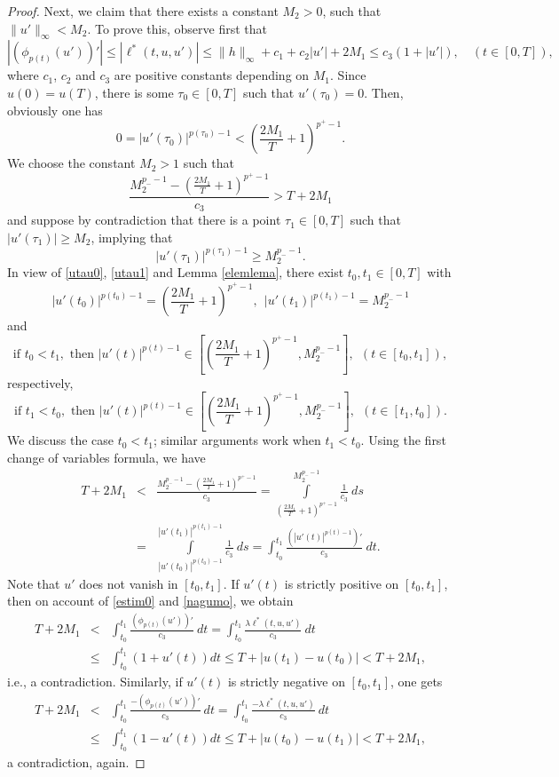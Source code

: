 \documentclass[11pt]{amsart}
\numberwithin{equation}{section} \textwidth=15.5cm
\begin{document}
\begin{proof}
Next, we claim that there exists a constant $M_2>0$, such that $\|u'\|_\infty<M_2$. To prove this, observe first that
\begin{equation}\label{nagumo}
    |(\phi_{p(t)}(u'))'|\leq|\ell^*(t,u,u')|\leq\|h\|_{\infty}+c_1+c_2|u'|+2M_1\leq c_3(1+|u'|),\quad (t\in[0,T]),
\end{equation}
where $c_1$, $c_2$ and $c_3$ are positive constants depending on $M_1$. Since $u(0)=u(T)$, there is some $\tau_0\in[0,T]$ such that $u'(\tau_0)=0$. Then, obviously one has
\begin{equation}\label{utau0}
    0=|u'(\tau_0)|^{p(\tau_0)-1}<\left(\frac{2M_1}{T}+1\right)^{p^+-1}.
\end{equation}
\noindent We choose the constant $M_2>1$ such that $$\frac{M_2^{p_--1}-\left(\displaystyle\frac{2M_1}{T}+1\right)^{p^+-1}}{c_3}>T+2M_1$$
and suppose by contradiction that there is a point $\tau_1\in [0,T]$ such that $|u'(\tau_1)|\geq M_2$, implying that
\begin{equation}\label{utau1}
    |u'(\tau_1)|^{p(\tau_1)-1}\geq M_2^{p_--1}.
\end{equation}
In view of \eqref{utau0}, \eqref{utau1} and Lemma \ref{elemlema}, there exist $t_0,t_1\in[0,T]$ with $$|u'(t_0)|^{p(t_0)-1}=\left(\displaystyle\frac{2M_1}{T}+1\right)^{p^+-1},\ \ |u'(t_1)|^{p(t_1)-1}=M_2^{p_--1}$$ and
$$\mbox{if } t_0<t_1, \mbox{ then } |u'(t)|^{p(t)-1}\in\left[\left(\displaystyle\frac{2M_1}{T}+1\right)^{p^+-1},M_2^{p_--1}\right],\ \ (t\in[t_0,t_1]),$$
respectively,
$$\mbox{if } t_1<t_0, \mbox{ then } |u'(t)|^{p(t)-1}\in\left[\left(\displaystyle\frac{2M_1}{T}+1\right)^{p^+-1},M_2^{p_--1}\right],\ \  (t\in[t_1,t_0]).$$
We discuss the case $t_0<t_1$; similar arguments work when $t_1<t_0$. Using the first change of variables formula, we have
\begin{eqnarray}\label{estim0}
  T+2M_1 &<& \frac{M_2^{p_--1}-\left(\displaystyle\frac{2M_1}{T}+1\right)^{p^+-1}}{c_3} =\int\limits_{\left(\frac{2M_1}{T}+1\right)^{p^+-1}}^{M_2^{p_--1}}\frac{1}{c_3}\ ds\nonumber\\
  &=& \int\limits_{|u'(t_0)|^{p(t_0)-1}}^{|u'(t_1)|^{p(t_1)-1}}\frac{1}{c_3}\ ds=\int_{t_0}^{t_1}\frac{(|u'(t)|^{p(t)-1})'}{c_3}\ dt.
\end{eqnarray}
Note that $u'$ does not vanish in $[t_0,t_1]$. If $u'(t)$ is strictly positive on $[t_0,t_1]$, then on account of \eqref{estim0} and \eqref{nagumo}, we obtain
\begin{eqnarray*}
  T+2M_1 &<& \int_{t_0}^{t_1}\frac{(\phi_{p(t)}(u'))'}{c_3}\ dt=\int_{t_0}^{t_1}\frac{\lambda\ell^*(t,u,u')}{c_3}\ dt \\
  &\leq& \int_{t_0}^{t_1}(1+u'(t)) dt\leq T+|u(t_1)-u(t_0)|<T+2M_1,
\end{eqnarray*}
i.e., a contradiction. Similarly, if $u'(t)$ is strictly negative on $[t_0,t_1]$, one gets
\begin{eqnarray*}
  T+2M_1 &<& \int_{t_0}^{t_1}\frac{-(\phi_{p(t)}(u'))'}{c_3}\ dt=\int_{t_0}^{t_1}\frac{-\lambda\ell^*(t,u,u')}{c_3}\ dt \\
  &\leq& \int_{t_0}^{t_1}(1-u'(t)) dt\leq T+|u(t_0)-u(t_1)|<T+2M_1,
\end{eqnarray*}
 a contradiction, again.
\smallskip


\end{proof}
\end{document}

